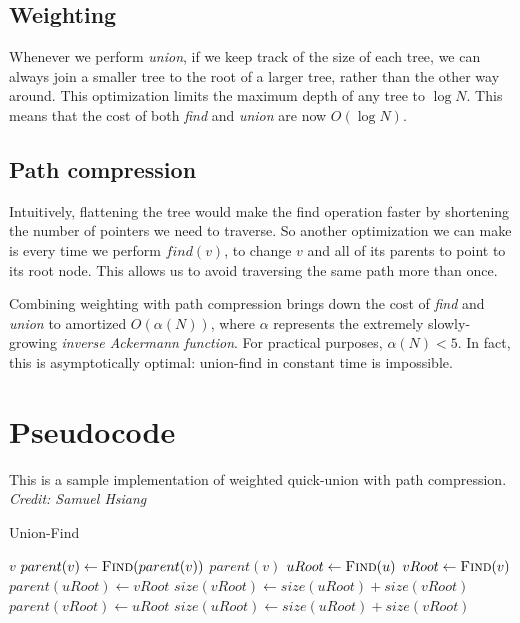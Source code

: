 \documentclass{article}
\begin{document}
\subsection{Weighting}
Whenever we perform \textit{union}, if we keep track of the size of each tree, we can always join a smaller tree to the root of a larger tree, rather than the other way around. This optimization limits the maximum depth of any tree to $\log N$. This means that the cost of both \textit{find} and \textit{union} are now $O(\log N)$.

\subsection{Path compression}
Intuitively, flattening the tree would make the find operation faster by shortening the number of pointers we need to traverse. So another optimization we can make is every time we perform $find(v)$, to change $v$ and all of its parents to point to its root node. This allows us to avoid traversing the same path more than once.

Combining weighting with path compression brings down the cost of \textit{find} and \textit{union} to amortized $O(\alpha(N))$, where $\alpha$ represents the extremely slowly-growing \textit{inverse Ackermann function}. For practical purposes, $\alpha(N)<5$. In fact, this is asymptotically optimal: union-find in constant time is impossible.

\pagebreak

\section{Pseudocode}
This is a sample implementation of weighted quick-union with path compression. \textit{Credit: Samuel Hsiang}

\begin{algorithm}[H]
\caption{Union-Find}
\begin{algorithmic}
		\State \Return $v$
    \EndIf
    \State $parent(v) \gets \Call{Find}{parent(v)}$
    \State \Return $parent(v)$
\EndFunction
{}
	\State $uRoot \gets \Call{Find}{u}$
	\State $vRoot \gets \Call{Find}{v}$
		\State \Return
	\EndIf
    	\State $parent(uRoot) \gets vRoot$
        \State $size(vRoot) \gets size(uRoot) + size(vRoot)$
    \Else
    	\State $parent(vRoot) \gets uRoot$
        \State $size(uRoot) \gets size(uRoot) + size(vRoot)$
    \EndIf
\EndFunction
\end{algorithmic}
\end{algorithm}
\end{document}
